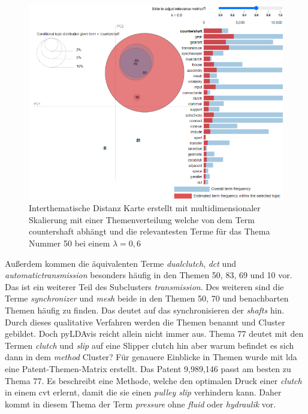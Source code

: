 \begin{landscape}
	\begin{figure}[htpb]
		\centering
		\includegraphics[width=19.29cm,keepaspectratio=true]{img/clustering_process02.png}
		\caption{
			Interthematische Distanz Karte erstellt mit multidimensionaler Skalierung mit einer Themenverteilung welche von dem Term countershaft abhängt und die relevantesten Terme für das Thema Nummer 50 bei einem $\lambda = 0,6$ 
		}
		\label{fig:clustering_process02}
	\end{figure}
\end{landscape}

 
Außerdem kommen die äquivalenten Terme \emph{dualclutch}, \emph{dct} und \emph{automatictransmission} besonders häufig in den Themen 50, 83, 69 und 10 vor. Das ist ein weiterer Teil des Subclusters \emph{transmission}. Des weiteren sind die Terme \emph{synchronizer} und \emph{mesh} beide in den Themen 50, 70 und benachbarten Themen häufig zu finden. Das deutet auf das synchronisieren der \emph{shafts} hin. Durch dieses qualitative Verfahren werden die Themen benannt und Cluster gebildet. Doch \gls{pyLDAvis} reicht allein nicht immer aus. Thema 77 deutet mit den Termen \emph{clutch} und \emph{slip} auf eine Slipper clutch hin aber warum befindet es sich dann in dem \emph{method} Cluster? Für genauere Einblicke in Themen wurde mit \gls{lda} eine Patent-Themen-Matrix erstellt. Das Patent 9,989,146 passt am besten zu Thema 77. Es beschreibt eine Methode, welche den optimalen Druck einer \emph{clutch} in einem \gls{cvt} erlernt, damit die sie einen \emph{pulley slip} verhindern kann. Daher kommt in diesem Thema der Term \emph{pressure} ohne \emph{fluid} oder \emph{hydraulik} vor.
 

